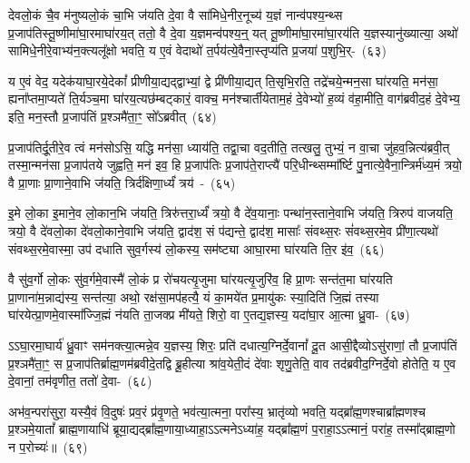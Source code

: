 देवलो॒कं चै॒व म॑नुष्यलो॒कं चा॒भि ज॑यति दे॒वा वै सा॑मिधे॒नीर॒नूच्य॑ य॒ज्ञं नान्व॑पश्य॒न्थ्स प्र॒जा\-प॑तिस्तू॒ष्णीमा॑घा॒र\-माघा॑र\-य॒त् ततो॒ वै दे॒वा य॒ज्ञमन्व॑पश्य॒न्॒ यत् तू॒ष्णीमा॑\-घा॒रमा॑\-घा॒रय॑ति य॒ज्ञस्यानु॑\-ख्यात्या॒ अथो॑ सामिधे॒नीरे॒वाभ्य॑न॒क्त्यलू᳚क्षो भवति॒ य ए॒वं वेदाथो॑ त॒र्पय॑त्ये॒वैना॒स्तृप्य॑ति प्र॒जया॑ प॒शुभि॒र्-~(६३)

य ए॒वं वेद॒ यदेक॑याघा॒रये॒देकां᳚ प्रीणीया॒द्यद्द्वाभ्यां॒ द्वे प्री॑णीया॒द्यत् ति॒सृभि॒रति॒ तद्रे॑चये॒न्मन॒सा घा॑रयति॒ मन॑सा॒ ह्यना᳚प्तमा॒प्यते॑ ति॒र्यञ्च॒मा घा॑रय॒त्यछ॑म्बट्कारं॒ वाक्च॒ मन॑श्चार्तीयेताम॒हं दे॒वेभ्यो॑ ह॒व्यं व॑हा॒मीति॒ वाग॑ब्रवीद॒हं दे॒वेभ्य॒ इति॒ मन॒स्तौ प्र॒जा\-प॑तिं प्र॒श्ञमै॑ता॒ꣳ॒ सो᳚\-ऽब्रवीत्~(६४)

प्र॒जा\-प॑तिर्दू॒तीरे॒व त्वं मन॑सो\-ऽसि॒ यद्धि मन॑सा॒ ध्याय॑ति॒ तद्वा॒चा वद॒तीति॒ तत्खलु॒ तुभ्यं॒ न वा॒चा जु॑हव॒न्नित्य॑ब्रवी॒त् तस्मा॒न्मन॑सा प्र॒जा\-प॑तये जुह्वति॒ मन॑ इव॒ हि प्र॒जा\-प॑तिः प्र॒जा\-प॑ते॒राप्त्यै॑ परि॒धीन्थ्सम्मा᳚र्ष्टि पु॒नात्ये॒वैना॒न्त्रिर्म॑ध्य॒मं त्रयो॒ वै प्रा॒णाः प्रा॒णाने॒वाभि ज॑यति॒ त्रिर्द॑क्षिणा॒र्ध्यं॑ त्रय॑~-~(६५)

इ॒मे लो॒का इ॒माने॒व लो॒कान॒भि ज॑यति॒ त्रिरु॑त्तरा॒र्ध्यं॑ त्रयो॒ वै दे॑व॒यानाः॒ पन्था॑न॒स्ताने॒वाभि ज॑यति॒ त्रिरुप॑ वाजयति॒ त्रयो॒ वै दे॑वलो॒का दे॑वलो॒काने॒वाभि ज॑यति॒ द्वाद॑श॒ सं प॑द्यन्ते॒ द्वाद॑श॒ मासाः᳚ संवथ्स॒रः सं॑वथ्स॒रमे॒व प्री॑णा॒त्यथो॑ संवथ्स॒रमे॒वास्मा॒ उप॑ दधाति सुव॒र्गस्य॑ लो॒कस्य॒ सम॑ष्ट्या आघा॒रमा घा॑रयति ति॒र इ॑व॒~(६६)

वै सु॑व॒र्गो लो॒कः सु॑व॒र्गमे॒वास्मै॑ लो॒कं प्र रो॑चयत्यृ॒जुमा घा॑रयत्यृ॒जुरि॑व॒ हि प्रा॒णः सन्त॑त॒मा घा॑रयति प्रा॒णाना॑म॒न्नाद्य॑स्य॒ सन्त॑त्या॒ अथो॒ रक्ष॑सा॒मप॑हत्यै॒ यं का॒मये॑त प्र॒मायु॑कः स्या॒दिति॑ जि॒ह्मं तस्या घा॑रयेत्प्रा॒णमे॒वास्मा᳚ज्जि॒ह्मं न॑यति ता॒जक्प्र मी॑यते॒ शिरो॒ वा ए॒तद्य॒ज्ञस्य॒ यदा॑घा॒र आ॒त्मा ध्रु॒वा-~(६७)

ऽ\-ऽघा॒रमा॒घार्य॑ ध्रु॒वाꣳ सम॑नक्त्या॒त्मन्ने॒व य॒ज्ञस्य॒ शिरः॒ प्रति॑ दधा\-त्य॒\-ग्निर्दे॒वानां᳚ दू॒त आसी॒द्दैव्यो\-ऽसु॑राणां॒ तौ प्र॒जा\-प॑तिं प्र॒श्ञमै॑ता॒ꣳ॒ स प्र॒जा\-प॑तिर्ब्राह्म॒णम॑ब्रवीदे॒तद्वि ब्रू॒हीत्या श्रा॑व॒येती॒दं दे॑वाः शृणु॒तेति॒ वाव तद॑ब्रवीद॒ग्निर्दे॒वो होतेति॒ य ए॒व दे॒वानां॒ तम॑वृणीत॒ ततो॑ \mbox{दे॒वा-~(६८)}

अभ॑व॒न्परा॑सुरा॒ यस्यै॒वं वि॒दुषः॑ प्रव॒रं प्र॑वृ॒णते॒ भव॑त्या॒त्मना॒ परा᳚स्य॒ भ्रातृ॑व्यो भवति॒ यद्ब्रा᳚ह्म॒णश्चाब्रा᳚ह्मणश्च प्र॒श्ञमे॒यातां᳚ ब्राह्म॒णायाधि॑ ब्रूया॒द्यद्ब्रा᳚ह्म॒णाया॒ध्याहा॒\-ऽऽ\-त्मने\-ऽध्या॑ह॒ यद्ब्रा᳚ह्म॒णं प॒राहा॒\-ऽऽ\-त्मानं॒ परा॑ह॒ तस्मा᳚द्ब्राह्म॒णो न प॒रोच्यः॑॥~(६९)


